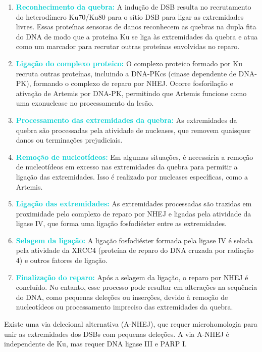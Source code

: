 \documentclass[11pt,a4paper]{article}
\begin{document}
	\begin{enumerate}[label=\textcolor{CarnationPink}{\arabic*${}^\circ $}]
		\item \textcolor{DarkTurquoise}{\textbf{Reconhecimento da quebra:}} A indução de DSB resulta no recrutamento do heterodímero Ku70/Ku80 para o sítio DSB para ligar as extremidades livres. Essas proteínas sensoras de danos reconhecem as quebras na dupla fita do DNA de modo que a proteína Ku se liga às extremidades da quebra e atua como um marcador para recrutar outras proteínas envolvidas no reparo.
		\item \textcolor{DarkTurquoise}{\textbf{Ligação do complexo proteico:}} O complexo proteico formado por Ku recruta outras proteínas, incluindo a DNA-PKcs (cinase dependente de DNA-PK), formando o complexo de reparo por NHEJ. Ocorre fosforilação e ativação de Artemis por DNA-PK, permitindo que Artemis funcione como uma exonuclease no processamento da lesão.
		\item \textcolor{DarkTurquoise}{\textbf{Processamento das extremidades da quebra:}} As extremidades da quebra são processadas pela atividade de nucleases, que removem quaisquer danos ou terminações prejudiciais.
		\item \textcolor{DarkTurquoise}{\textbf{Remoção de nucleotídeos:}} Em algumas situações, é necessária a remoção de nucleotídeos em excesso nas extremidades da quebra para permitir a ligação das extremidades. Isso é realizado por nucleases específicas, como a Artemis.
		\item \textcolor{DarkTurquoise}{\textbf{Ligação das extremidades:}} As extremidades processadas são trazidas em proximidade pelo complexo de reparo por NHEJ e ligadas pela atividade da ligase IV, que forma uma ligação fosfodiéster entre as extremidades.
		\item \textcolor{DarkTurquoise}{\textbf{Selagem da ligação:}}  A ligação fosfodiéster formada pela ligase IV é selada pela atividade da XRCC4 (proteína de reparo do DNA cruzada por radiação 4) e outros fatores de ligação.
		\item \textcolor{DarkTurquoise}{\textbf{Finalização do reparo:}} Após a selagem da ligação, o reparo por NHEJ é concluído. No entanto, esse processo pode resultar em alterações na sequência do DNA, como pequenas deleções ou inserções, devido à remoção de nucleotídeos ou processamento impreciso das extremidades da quebra.
	\end{enumerate}


	Existe uma via delecional alternativa (A-NHEJ), que requer microhomologia para unir as extremidades dos DSBs com pequenas deleções. A via A-NHEJ é independente de Ku, mas requer DNA ligase III e PARP I. 
	
\end{document}
